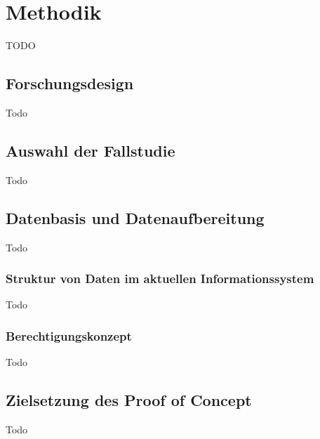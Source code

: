 \section{Methodik}
TODO

\subsection{Forschungsdesign}
Todo

\subsection{Auswahl der Fallstudie}
Todo

\subsection{Datenbasis und Datenaufbereitung}
Todo

\subsubsection{Struktur von Daten im aktuellen Informationssystem}
Todo

\subsubsection{Berechtigungskonzept}
Todo

\subsection{Zielsetzung des Proof of Concept}
Todo
